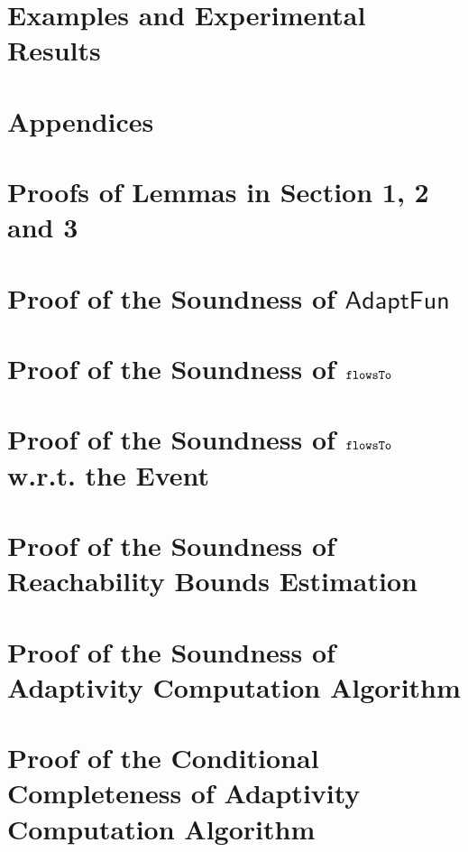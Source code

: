 \documentclass[a4paper,11pt]{article}
\newcommand{\THESYSTEM}{\textsf{AdaptFun}}
\begin{document}
\section{Examples and Experimental Results}


%
\clearpage
\appendix
{}
\section*{Appendices}
\section{Proofs of Lemmas in Section 1, 2 and 3 }
\label{apdx:lemma_sec123}

\section{Proof of the Soundness of $\THESYSTEM$}
\label{apdx:adapt_soundness}

\clearpage
\section{Proof of the Soundness of $\mathtt{flowsTo}$}
\label{apdx:flowsto_soundness}

\clearpage
\section{Proof of the Soundness of $\mathtt{flowsTo}$ w.r.t. the Event}
\label{apdx:flowsto_event_soundness}

\clearpage
% 
% 
\clearpage
\section{Proof of the Soundness of Reachability Bounds Estimation}
\label{apdx:reachability_soundness}

\clearpage
% 
\section{Proof of the Soundness of Adaptivity Computation Algorithm}
\label{apdx:adaptalg_soundness}

\section{Proof of the Conditional Completeness of Adaptivity Computation Algorithm}
\label{apdx:adaptalg_completeness}



\end{document}
